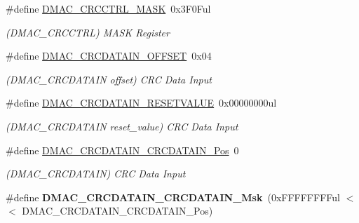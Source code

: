 \begin{DoxyCompactItemize}
\item 
\hypertarget{group___s_a_m_l21___d_m_a_c_ga3d0e4123fdb32eb7c37e85062b3a0b61}{}\#define \hyperlink{group___s_a_m_l21___d_m_a_c_ga3d0e4123fdb32eb7c37e85062b3a0b61}{D\+M\+A\+C\+\_\+\+C\+R\+C\+C\+T\+R\+L\+\_\+\+M\+A\+S\+K}~0x3\+F0\+Ful\label{group___s_a_m_l21___d_m_a_c_ga3d0e4123fdb32eb7c37e85062b3a0b61}

\begin{DoxyCompactList}\small\item\em (D\+M\+A\+C\+\_\+\+C\+R\+C\+C\+T\+R\+L) M\+A\+S\+K Register \end{DoxyCompactList}\item 
\hypertarget{group___s_a_m_l21___d_m_a_c_gac3b380f3a651a60145992fd8eb03334b}{}\#define \hyperlink{group___s_a_m_l21___d_m_a_c_gac3b380f3a651a60145992fd8eb03334b}{D\+M\+A\+C\+\_\+\+C\+R\+C\+D\+A\+T\+A\+I\+N\+\_\+\+O\+F\+F\+S\+E\+T}~0x04\label{group___s_a_m_l21___d_m_a_c_gac3b380f3a651a60145992fd8eb03334b}

\begin{DoxyCompactList}\small\item\em (D\+M\+A\+C\+\_\+\+C\+R\+C\+D\+A\+T\+A\+I\+N offset) C\+R\+C Data Input \end{DoxyCompactList}\item 
\hypertarget{group___s_a_m_l21___d_m_a_c_ga5534ffe7438beca32743f1f81709677f}{}\#define \hyperlink{group___s_a_m_l21___d_m_a_c_ga5534ffe7438beca32743f1f81709677f}{D\+M\+A\+C\+\_\+\+C\+R\+C\+D\+A\+T\+A\+I\+N\+\_\+\+R\+E\+S\+E\+T\+V\+A\+L\+U\+E}~0x00000000ul\label{group___s_a_m_l21___d_m_a_c_ga5534ffe7438beca32743f1f81709677f}

\begin{DoxyCompactList}\small\item\em (D\+M\+A\+C\+\_\+\+C\+R\+C\+D\+A\+T\+A\+I\+N reset\+\_\+value) C\+R\+C Data Input \end{DoxyCompactList}\item 
\hypertarget{group___s_a_m_l21___d_m_a_c_ga2713a15a580d2050de8cc774fdd40e3d}{}\#define \hyperlink{group___s_a_m_l21___d_m_a_c_ga2713a15a580d2050de8cc774fdd40e3d}{D\+M\+A\+C\+\_\+\+C\+R\+C\+D\+A\+T\+A\+I\+N\+\_\+\+C\+R\+C\+D\+A\+T\+A\+I\+N\+\_\+\+Pos}~0\label{group___s_a_m_l21___d_m_a_c_ga2713a15a580d2050de8cc774fdd40e3d}

\begin{DoxyCompactList}\small\item\em (D\+M\+A\+C\+\_\+\+C\+R\+C\+D\+A\+T\+A\+I\+N) C\+R\+C Data Input \end{DoxyCompactList}\item 
\hypertarget{group___s_a_m_l21___d_m_a_c_ga813549dfe6c707f8327c541b2b4991f8}{}\#define {\bfseries D\+M\+A\+C\+\_\+\+C\+R\+C\+D\+A\+T\+A\+I\+N\+\_\+\+C\+R\+C\+D\+A\+T\+A\+I\+N\+\_\+\+Msk}~(0x\+F\+F\+F\+F\+F\+F\+F\+Ful $<$$<$ D\+M\+A\+C\+\_\+\+C\+R\+C\+D\+A\+T\+A\+I\+N\+\_\+\+C\+R\+C\+D\+A\+T\+A\+I\+N\+\_\+\+Pos)\label{group___s_a_m_l21___d_m_a_c_ga813549dfe6c707f8327c541b2b4991f8}


\end{DoxyCompactItemize}
